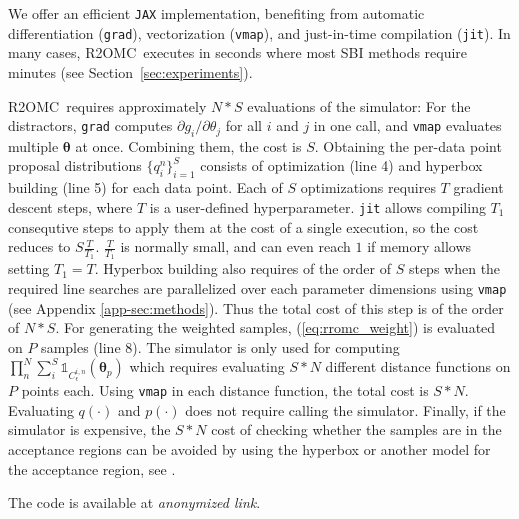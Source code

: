 \documentclass[twoside]{article}
\newcommand{\thb}{\boldsymbol{\theta}}
\newcommand{\rromc}{R2OMC}
\newcommand{\LinkToCode}{\textit{anonymized link}}
\begin{document}
We offer an efficient \texttt{JAX} implementation, benefiting from automatic differentiation (\texttt{grad}), vectorization (\texttt{vmap}), and just-in-time compilation (\texttt{jit}). 
In many cases, \rromc~executes in seconds where most SBI methods require minutes (see Section~\ref{sec:experiments}). 

\rromc~requires approximately $N * S$ evaluations of the simulator: For the distractors, \texttt{grad} computes $\partial g_i/\partial \theta_j$ for all $i$ and $j$ in one call, and \texttt{vmap} evaluates multiple $\thb$ at once.
Combining them, the cost is $S$. Obtaining the per-data point proposal distributions $\{q_i^n\}_{i=1}^S$ consists of optimization (line 4) and hyperbox building (line 5) for each data point. Each of $S$ optimizations requires $T$ gradient descent steps, where $T$ is a user-defined hyperparameter. \texttt{jit} allows compiling $T_1$ consequtive steps to apply them at the cost of a single execution, so the cost reduces to $S \frac{T}{T_1}$. $\frac{T}{T_1}$ is normally small, and can even reach $1$ if memory allows setting $T_1 = T$. Hyperbox building also requires of the order of $S$ steps when the required line searches are parallelized over each parameter dimensions using \texttt{vmap} (see Appendix \ref{app-sec:methods}). Thus the total cost of this step is of the order of $N*S$. For generating the weighted samples, (\ref{eq:rromc_weight}) is evaluated on $P$ samples (line 8).
The simulator is only used for computing $\prod_n^N \sum_i^S \mathbb{1}_{C_{\epsilon}^{i,n}}(\thb_p)$ which requires evaluating $S * N$ different distance functions on $P$ points each. Using \texttt{vmap} in each distance function, the total cost is $S * N$. Evaluating $q(\cdot)$ and $p(\cdot)$ does not require calling the simulator. Finally, if the simulator is expensive, the $S *N$ cost of checking whether the samples are in the acceptance regions can be avoided by using the hyperbox or another model for the acceptance region, see \citet{ikonomov2020robust}. 

The code is available at \LinkToCode.




\end{document}
